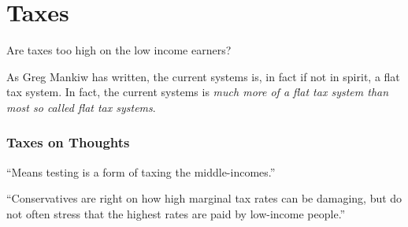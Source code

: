 \chapter{Taxes}%
\label{chpt:taxes}

Are taxes too high on the low income earners?

As Greg Mankiw has written, the current systems is, in fact if not in spirit, a
flat tax system. In fact, the current systems is \emph{much more of a flat tax
system than most so called flat tax systems}.


\subsection{Taxes on Thoughts}

``Means testing is a form of taxing the middle-incomes.''

``Conservatives are right on how high marginal tax rates can be damaging, but
do not often stress that the highest rates are paid by low-income people.''

